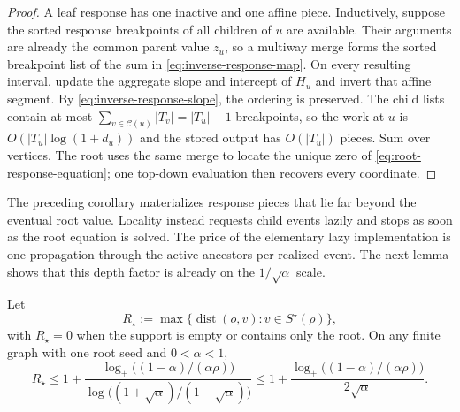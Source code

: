 \begin{proof}
A leaf response has one inactive and one affine piece.  Inductively, suppose
the sorted response breakpoints of all children of $u$ are available.  Their
arguments are already the common parent value $z_u$, so a multiway merge
forms the sorted breakpoint list of the sum in
\cref{eq:inverse-response-map}.  On every resulting interval, update the
aggregate slope and intercept of $H_u$ and invert that affine segment.  By
\cref{eq:inverse-response-slope}, the ordering is preserved.  The child lists
contain at most
$\sum_{v\in\mathcal C(u)}|T_v|=|T_u|-1$ breakpoints, so the work at $u$ is
$O(|T_u|\log(1+d_u))$ and the stored output has $O(|T_u|)$ pieces.  Sum over
vertices.  The root uses the same merge to locate the unique zero of
\cref{eq:root-response-equation}; one top-down evaluation then recovers every
coordinate.
\end{proof}

The preceding corollary materializes response pieces that lie far beyond the
eventual root value.  Locality instead requests child events lazily and stops
as soon as the root equation is solved.  The price of the elementary lazy
implementation is one propagation through the active ancestors per realized
event.  The next lemma shows that this depth factor is already on the
$1/\sqrt\alpha$ scale.

\begin{lemma}
\label{lem:graph-support-radius}
Let
\begin{equation*}
 R_\star:=\max\{\operatorname{dist}(o,v):v\in S^\star(\rho)\},
\end{equation*}
with $R_\star=0$ when the support is empty or contains only the root.  On any
finite graph with one root seed and $0<\alpha<1$,
\begin{equation}
 R_\star
 \leq
 1+\frac{
  \log_+\!\bigl((1-\alpha)/(\alpha\rho)\bigr)
 }{
  \log\!\bigl((1+\sqrt\alpha)/(1-\sqrt\alpha)\bigr)
 }
 \leq
 1+\frac{
  \log_+\!\bigl((1-\alpha)/(\alpha\rho)\bigr)
 }{2\sqrt\alpha}.
 \label{eq:graph-support-radius}
\end{equation}
\end{lemma}

